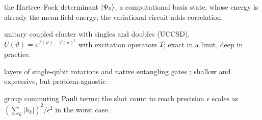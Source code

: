 \documentclass[handoutsbeamer.tex]{subfiles}
\begin{document}
\begin{frame}
\begin{description}\setlength\itemsep{0.2em}
    \item[Initial state] the Hartree--Fock determinant $\ket{\Psi_0}$, a computational basis state, whose energy is already the mean-field energy; the variational circuit adds correlation.
    \item[Chemically inspired ansatz] unitary coupled cluster with singles and doubles (UCCSD), $U(\vartheta) = e^{T(\vartheta) - T(\vartheta)^\dagger}$ with excitation operators $T$; exact in a limit, deep in practice.
    \item[Hardware-efficient ansatz] layers of single-qubit rotations and native entangling gates \cite{kandala2017hardware}; shallow and expressive, but problem-agnostic.
    \item[Measurement] group commuting Pauli terms; the shot count to reach precision $\epsilon$ scales as $(\sum_k|h_k|)^2/\epsilon^2$ in the worst case.
\end{description}
\end{frame}
\end{document}
